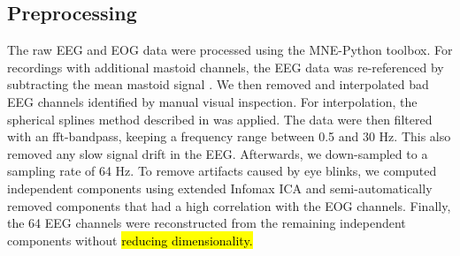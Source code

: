\subsection*{Preprocessing}
The raw EEG and EOG data were processed using the MNE-Python toolbox. 
For recordings with additional mastoid channels, the EEG data was re-referenced by subtracting the mean mastoid signal \cite{teplan_fundamentals_2002}.
We then removed and interpolated bad EEG channels identified by manual visual inspection.
For interpolation, the spherical splines method described in \cite{perrin_spherical_1989} was applied.
The data were then filtered with an fft-bandpass, keeping a frequency range between 0.5 and 30 Hz.
This also removed any slow signal drift in the EEG.
Afterwards, we down-sampled to a sampling rate of 64 Hz.
To remove artifacts caused by eye blinks, we computed independent components using extended Infomax \ac{ICA} \cite{lee_independent_1999} and semi-automatically removed components that had a high correlation with the EOG channels.
Finally, the 64 EEG channels were reconstructed from the remaining independent components without  \hl{reducing dimensionality.}